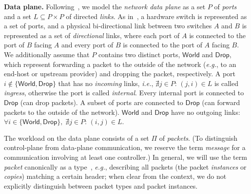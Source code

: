\documentclass[11pt,pdftex,letter]{article}
\newcommand{\eg}{{\it e.g.}}
\newcommand{\ie}{{\it i.e.}}
\newcommand{\mcnote}[1]{\textcolor{heraldBlue}{\small \bf [MC: #1]}}
\newcommand{\ssnote}[1]{\textcolor{heraldBlue}{\small \bf [SS: #1]}}
\newcommand{\pknote}[1]{\textcolor{heraldBlue}{\small \bf [PK: #1]}}
\newcommand{\mcnote}[1]{}
\newcommand{\ssnote}[1]{}
\newcommand{\pknote}[1]{}
\begin{document}
\vspace{1mm}\noindent\textbf{Data plane.}
%
Following~\cite{network-update}, we model the \emph{network data plane}
as a set $P$ of \emph{ports} and a set $L\subseteq P\times P$ of directed
\emph{links}.
As in~\cite{network-update}, a hardware switch is represented as
  a set of ports,  and a physical bi-directional link between two
  switches $A$ and $B$ is represented as a set of \emph{directional}
  links,  where each port of $A$ is connected to the port of $B$
  facing $A$ and every port of $B$ is connected to the port of $A$
  facing $B$.
We additionally assume that $P$ contains two distinct ports,
$\textsf{World}$ and $\textsf{Drop}$,     
which represent forwarding a packet to the outside of the network (\eg, to an end-host or upstream provider) and
dropping the packet, respectively. 
A port $i\notin\{\textsf{World},\textsf{Drop}\}$ that has no \emph{incoming} links, \ie, $\nexists j\in P$:
$(j,i)\in L$  is called \emph{ingress}, 
otherwise the port is called \emph{internal}.
Every internal port is connected to $\textsf{Drop}$ (can drop
packets). A subset of ports are connected to $\textsf{Drop}$ (can
forward packets to the outside of the network).
$\textsf{World}$ and $\textsf{Drop}$ have no outgoing links: $\forall
i\in \{\textsf{World},\textsf{Drop}\},\;\nexists j\in P$:
$(i,j)\in L$.


The workload on the data plane consists of a set $\Pi$ of \emph{packets}.
(To distinguish control-plane from data-plane communication,
we reserve the term \emph{message} for a communication involving at least one controller.)
In general, we will use the term \emph{packet} canonically as a type~\cite{network-update},
\eg, describing all packets (the packet \emph{instances} or \emph{copies}) matching a certain header;
when clear from the context, we do not explicitly distinguish between
packet types and packet instances.
%
\end{document}
